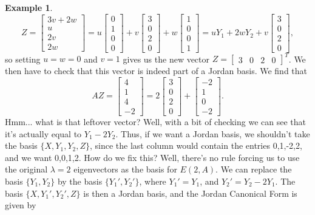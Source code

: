\documentclass[12pt,letterpaper]{article}
\theoremstyle{definition}
\newtheorem{example}{Example}
\begin{document}
\begin{example}
\[
 Z = \begin{bmatrix}3v+2w\\u\\2v\\2w\end{bmatrix}=u\begin{bmatrix}0\\1\\0\\0\end{bmatrix} +v\begin{bmatrix}3\\0\\2\\0\end{bmatrix}+w\begin{bmatrix}1\\0\\0\\1\end{bmatrix}=uY_1+2wY_2+v\begin{bmatrix}3\\0\\2\\0\end{bmatrix},
\]
so setting $u=w=0$ and $v=1$ gives us the new vector $Z=\begin{bmatrix}3&0&2&0\end{bmatrix}^T$. We then have to check that this vector is indeed part of a Jordan basis. We find that
\[
 AZ = \begin{bmatrix}4\\1\\4\\-2\end{bmatrix} = 2\begin{bmatrix}3\\0\\2\\0\end{bmatrix}+\begin{bmatrix}-2\\1\\0\\-2\end{bmatrix}.
\]
Hmm... what is that leftover vector? Well, with a bit of checking we can see that it's actually equal to $Y_1-2Y_2$. Thus, if we want a Jordan basis, we shouldn't take the basis $\{X,Y_1,Y_2,Z\}$, since the last column would contain the entries 0,1,-2,2, and we want 0,0,1,2. How do we fix this? Well, there's no rule forcing us to use the original $\lambda=2$ eigenvectors as the basis for $E(2,A)$. We can replace the basis $\{Y_1,Y_2\}$ by the basis $\{Y_1',Y_2'\}$, where $Y_1'=Y_1$, and $Y_2'=Y_2-2Y_1$. The basis $\{X,Y_1',Y_2',Z\}$ is then a Jordan basis, and the Jordan Canonical Form is given by

\end{example}
\end{document}
